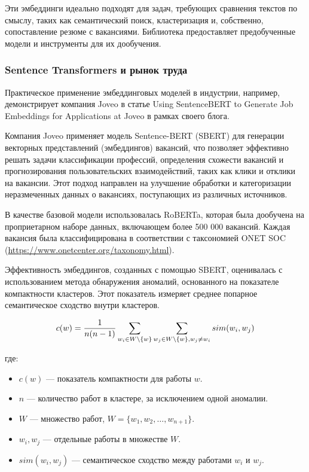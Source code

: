 \documentclass[14pt]{mmcs_article}
\begin{document}
Эти эмбеддинги идеально подходят для задач, требующих сравнения текстов по смыслу, таких как семантический поиск, кластеризация и, собственно, сопоставление резюме с вакансиями. Библиотека предоставляет предобученные модели и инструменты для их дообучения.

\subsubsection*{Sentence Transformers и рынок труда}\label{sentence_transformers_application}

Практическое применение эмбеддинговых моделей в индустрии, например, демонстрирует компания Joveo в статье Using SentenceBERT to Generate Job Embeddings for Applications at Joveo \cite{joveo_sentencebert_2022} в рамках своего блога.

Компания Joveo применяет модель Sentence-BERT (SBERT) для генерации векторных представлений (эмбеддингов) вакансий, что позволяет эффективно решать задачи классификации профессий, определения схожести вакансий и прогнозирования пользовательских взаимодействий, таких как клики и отклики на вакансии. Этот подход направлен на улучшение обработки и категоризации неразмеченных данных о вакансиях, поступающих из различных источников.

В качестве базовой модели использовалась RoBERTa, которая была дообучена на проприетарном наборе данных, включающем более 500 000 вакансий. Каждая вакансия была классифицирована в соответствии с таксономией ONET SOC (\url{https://www.onetcenter.org/taxonomy.html}).

Эффективность эмбеддингов, созданных с помощью SBERT, оценивалась
с использованием метода обнаружения аномалий, основанного на показателе компактности кластеров. Этот показатель измеряет среднее попарное семантическое сходство внутри кластеров.

\begin{equation}
  \label{eq:compactness_cluster}
  \centering
  \allowdisplaybreaks[1]
  \begin{split}
    c(w) = \frac{1}{n(n-1)} \sum_{w_i \in W \setminus \{w\}} \sum_{w_j \in W \setminus \{w\}, w_j \neq w_i} sim(w_i, w_j)
  \end{split}
\end{equation}

где:
\begin{itemize}
  \item \( c(w) \) — показатель компактности для работы \( w \).
  \item \( n \) — количество работ в кластере, за исключением одной аномалии.
  \item \( W \) — множество работ, \( W = \{w_1, w_2, \ldots, w_{n+1}\} \).
  \item \( w_i, w_j \) — отдельные работы в множестве \( W \).
  \item \( sim(w_i, w_j) \) — семантическое сходство между работами \( w_i \) и \( w_j \).
\end{itemize}
\end{document}

